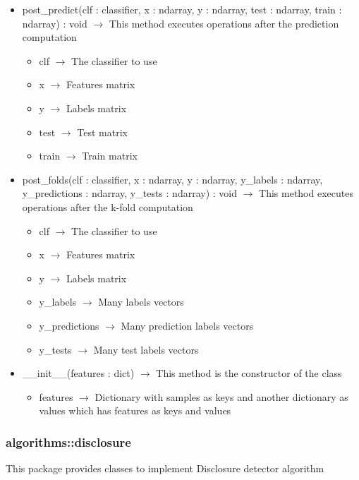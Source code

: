 \begin{description}
\begin{itemize}
\item post\_predict(clf : classifier, x : ndarray, y : ndarray, test : ndarray, train : ndarray) : void $\rightarrow$ This method executes operations after the prediction computation\begin{itemize}
\item clf $\rightarrow$ The classifier to use
\item x $\rightarrow$ Features matrix
\item y $\rightarrow$ Labels matrix
\item test $\rightarrow$ Test matrix
\item train $\rightarrow$ Train matrix
\end{itemize}

\item post\_folds(clf : classifier, x : ndarray, y : ndarray, y\_labels : ndarray, y\_predictions : ndarray, y\_tests : ndarray) : void $\rightarrow$ This method executes operations after the k-fold computation\begin{itemize}
\item clf $\rightarrow$ The classifier to use
\item x $\rightarrow$ Features matrix
\item y $\rightarrow$ Labels matrix
\item y\_labels $\rightarrow$ Many labels vectors
\item y\_predictions $\rightarrow$ Many prediction labels vectors
\item y\_tests $\rightarrow$ Many test labels vectors
\end{itemize}

\item \_\_init\_\_(features : dict) $\rightarrow$ This method is the constructor of the class\begin{itemize}
\item features $\rightarrow$ Dictionary with samples as keys and another dictionary as values which has features as keys and values
\end{itemize}

\end{itemize}

\end{description}
\subsubsection{algorithms::disclosure}
This package provides classes to implement Disclosure detector algorithm

